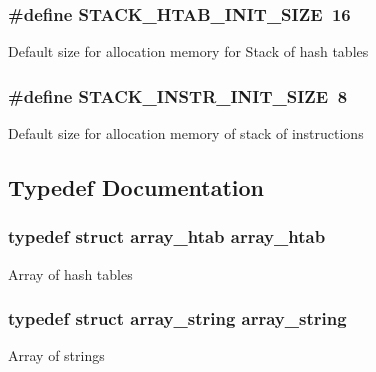 \subsubsection[{\texorpdfstring{S\+T\+A\+C\+K\+\_\+\+H\+T\+A\+B\+\_\+\+I\+N\+I\+T\+\_\+\+S\+I\+ZE}{STACK_HTAB_INIT_SIZE}}]{\setlength{\rightskip}{0pt plus 5cm}\#define S\+T\+A\+C\+K\+\_\+\+H\+T\+A\+B\+\_\+\+I\+N\+I\+T\+\_\+\+S\+I\+ZE~16}\hypertarget{group__structures_gaacafe24c4bd0e04c93bd17e8c669f47a}{}\label{group__structures_gaacafe24c4bd0e04c93bd17e8c669f47a}
Default size for allocation memory for Stack of hash tables 
\subsubsection[{\texorpdfstring{S\+T\+A\+C\+K\+\_\+\+I\+N\+S\+T\+R\+\_\+\+I\+N\+I\+T\+\_\+\+S\+I\+ZE}{STACK_INSTR_INIT_SIZE}}]{\setlength{\rightskip}{0pt plus 5cm}\#define S\+T\+A\+C\+K\+\_\+\+I\+N\+S\+T\+R\+\_\+\+I\+N\+I\+T\+\_\+\+S\+I\+ZE~8}\hypertarget{group__structures_ga132b2787e64d54f69abb3d2f6efa5378}{}\label{group__structures_ga132b2787e64d54f69abb3d2f6efa5378}
Default size for allocation memory of stack of instructions 

\subsection{Typedef Documentation}
\subsubsection[{\texorpdfstring{array\+\_\+htab}{array_htab}}]{\setlength{\rightskip}{0pt plus 5cm}typedef struct {\bf array\+\_\+htab}  {\bf array\+\_\+htab}}\hypertarget{group__structures_gafa5247cb58c9cbc3aacc8616d3bd3406}{}\label{group__structures_gafa5247cb58c9cbc3aacc8616d3bd3406}
Array of hash tables 
\subsubsection[{\texorpdfstring{array\+\_\+string}{array_string}}]{\setlength{\rightskip}{0pt plus 5cm}typedef struct {\bf array\+\_\+string}  {\bf array\+\_\+string}}\hypertarget{group__structures_gae454366e089196c48b5339fb91a9c7e4}{}\label{group__structures_gae454366e089196c48b5339fb91a9c7e4}
Array of strings 
